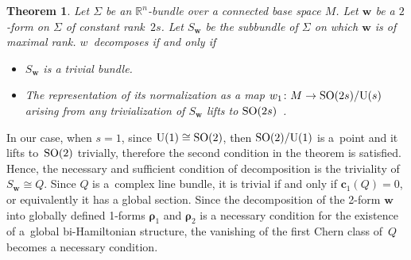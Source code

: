 \documentclass[pdftex]{sigma}
\numberwithin{equation}{section}
\newtheorem{Theorem}{Theorem}[section]
\begin{document}
\begin{Theorem}\label{theorem2} Let $\Sigma $ be an $\mathbb{R}^{n}$-bundle over a connected base space $M$. Let $\boldsymbol{w}$ be a $2$-form on $\Sigma $ of constant rank~$2s$. Let $S_{\boldsymbol{w}}$ be the subbundle of $\Sigma $ on which $\boldsymbol{w}$ is of maximal rank. $w$~decomposes if and only if
\begin{itemize}\itemsep=0pt
\item[$i)$] $S_{\boldsymbol{w}}$ is a trivial bundle.

\item[$ii)$] The representation of its normalization as a map $w_{1}\colon M\rightarrow {\rm SO}(2s)/{\rm U}(s)$ arising from any trivialization of $S_{\boldsymbol{w}}$ lifts to ${\rm SO}(2s)$~{\rm \cite{Dibag}}.
\end{itemize}
\end{Theorem}

In our case, when $s=1$, since ${\rm U}(1)\cong {\rm SO}(2)$, then ${\rm SO}(2)/{\rm U}(1)$ is a~point and it lifts to~${\rm SO}(2)$ trivially, therefore the second condition in the theorem is satisf\/ied. Hence, the necessary and suf\/f\/icient condition of decomposition is the triviality of $S_{\boldsymbol{w}}\cong Q$. Since $Q$ is a~complex line bundle, it is trivial if and only if $\boldsymbol{c}_{1}(Q)=0$, or equivalently it has a global section. Since the decomposition of the 2-form $\boldsymbol{w}$ into globally def\/ined 1-forms $\boldsymbol{\rho }_{1}$ and $\boldsymbol{\rho }_{2}$ is a necessary condition for the existence of a~global bi-Hamiltonian structure, the vanishing of the f\/irst Chern class of~$Q$ becomes a necessary condition.
\end{document}

